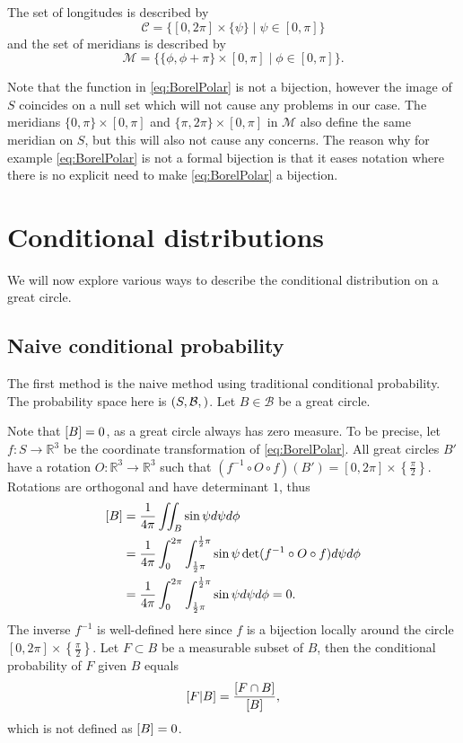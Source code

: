 \documentclass[twoside,a4paper]{report}
\theoremstyle{plain}
\theoremstyle{definition}
\theoremstyle{remark}
\numberwithin{equation}{chapter}
\newcommand{\R}{\mathbb{R}}
\let\P\relax
\DeclareMathOperator{\P}{\mathbb{P}}
\DeclareMathOperator{\1}{\mathbbm{1}}
\newcommand{\B}{\mathcal{B}}
\begin{document}
The set of longitudes is described by 
\begin{equation}
\mathcal{C}=\{[0,2\pi]\times\{\psi\}\mid\psi\in[0,\pi]\}
\end{equation}
and the set of meridians is described by
\begin{equation}
\mathcal{M}=\{\{\phi,\phi+\pi\}\times[0,\pi]\mid\phi\in[0,\pi]\}.
\end{equation}

Note that the function in \eqref{eq:BorelPolar} is not a bijection, however the image of $S$ coincides on a null set which will not cause any problems in our case. The meridians $\{0,\pi\}\times[0,\pi]$ and $\{\pi,2\pi\}\times[0,\pi]$ in $\mathcal{M}$ also define the same meridian on $S$, but this will also not cause any concerns. The reason why for example \eqref{eq:BorelPolar} is not a formal bijection is that it eases notation where there is no explicit need to make \eqref{eq:BorelPolar} a bijection.

\section{Conditional distributions}
We will now explore various ways to describe the conditional distribution on a great circle.
\subsection{Naive conditional probability}\label{sec:BorelNaive}
The first method is the naive method using traditional conditional probability. The probability space here is $(S,\B,\P)$. Let $B\in\B$ be a great circle.

Note that $\P[B]=0$, as a great circle always has zero measure. To be precise, let $f\colon S\to\R^3$ be the coordinate transformation of \eqref{eq:BorelPolar}. All great circles $B'$ have a rotation $O\colon\R^3\to\R^3$ such that $(f^{-1}\circ O\circ f)(B')=[0,2\pi]\times\left\{\frac{\pi}{2}\right\}$. Rotations are orthogonal and have determinant $1$, thus
\begin{align}
\P[B]&=\frac{1}{4\pi}\iint_B\sin\psi d\psi d\phi\\
&=\frac{1}{4\pi}\int_0^{2\pi}\int_{\frac{1}{2}\pi}^{\frac{1}{2}\pi}\sin\psi \det(f^{-1}\circ O\circ f)d\psi d\phi\\
&=\frac{1}{4\pi}\int_0^{2\pi}\int_{\frac{1}{2}\pi}^{\frac{1}{2}\pi}\sin\psi d\psi d\phi=0.
\end{align}
The inverse $f^{-1}$ is well-defined here since $f$ is a bijection locally around the circle $[0,2\pi]\times\left\{\frac{\pi}{2}\right\}$. Let $F\subset B$ be a measurable subset of $B$, then the conditional probability of $F$ given $B$ equals
\begin{equation}
\P[F|B]=\frac{\P[F\cap B]}{\P[B]},
\end{equation}
which is not defined as $\P[B]=0$.
\end{document}
